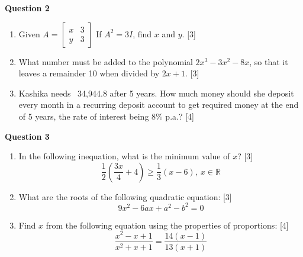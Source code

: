 \newpage
\noindent
\textbf{Question 2}\\
\begin{enumerate}[label=(\roman*)]

    \item Given $A = \begin{bmatrix*}  x & 3  \\  y & 3  \end{bmatrix*}$ 
        If $A^2 = 3I$, find $x$ and $y$. \hfill [3]

    \item What number must be added to the polynomial 
        $2x^3 - 3x^2 -8x$, so that it leaves a remainder 10 when 
        divided by $2x+1$. \hfill [3]

    \item Kashika needs \rupee~34,944.8 after 5 years. How much money 
        should she deposit every month in a recurring deposit account 
        to get required money at the end of 5 years, the rate of interest 
        being 8\% p.a.? \hfill [4]

\end{enumerate}

\par
\noindent
\textbf{Question 3}\\
\begin{enumerate}[label=(\roman*)]

    \item In the following inequation, what is the minimum value of $x$? \hfill [3]
        \[
            \frac12 \left(\frac{3x}{4}+4\right) \ge \frac13(x-6), \ x \in \mathbb{R}
        \]

    \item What are the roots of the following quadratic equation: \hfill [3]
        \[
            9x^2 - 6ax + a^2 - b^2 = 0 
        \]

    \item Find $x$ from the following equation using the properties of proportions: \hfill [4]
        \[
            \frac{x^2 - x + 1}{x^2 + x + 1} = \frac{14(x-1)}{13(x+1)}
        \]

\end{enumerate}

